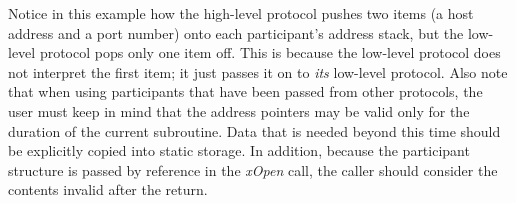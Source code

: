 Notice in this example how the high-level protocol pushes two 
items (a host address and a port number) onto each participant's
address stack, but the low-level protocol pops only one item off.
This is because the low-level protocol does not interpret the first
item; it just passes it on to {\em its} low-level protocol. Also note
that when using participants that have been passed from other
protocols, the user must keep in mind that the address pointers may be
valid only for the duration of the current subroutine.  Data that is
needed beyond this time should be explicitly copied into static
storage.  In addition, because the participant structure is passed by
reference in the {\em xOpen} call, the caller should consider the
contents invalid after the return.

